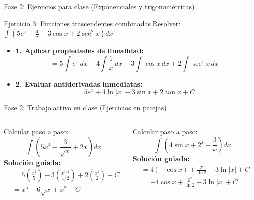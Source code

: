\documentclass[aspectratio=169,11pt]{beamer}
\begin{document}
\begin{frame}{Fase 2: Ejercicios para clase (Exponenciales y trigonométricas)}
\small
\begin{block}{Ejercicio 3: Funciones trascendentes combinadas}
Resolver: \quad $\displaystyle\int \left( 5e^x + \frac{4}{x} - 3\cos x + 2\sec^2 x \right) dx$
\end{block}
\vspace{0.06cm}
\begin{techbox}[title=Resolución paso a paso]
\footnotesize
\begin{itemize}[itemsep=2.5pt]
  \item \textbf{1. Aplicar propiedades de linealidad:}
  \[
  = 5\int e^x\,dx + 4\int \frac{1}{x}\,dx - 3\int \cos x\,dx + 2\int \sec^2 x\,dx
  \]
  \item \textbf{2. Evaluar antiderivadas inmediatas:}
  \[
  = 5e^x + 4\ln|x| - 3\sin x + 2\tan x + C
  \]
\end{itemize}
\end{techbox}
\end{frame}

\begin{frame}{Fase 2: Trabajo activo en clase (Ejercicios en parejas)}
\small
\begin{columns}[T,onlytextwidth]
\begin{checkbox}[title=Reto 1: Potencias y raíces]
\footnotesize
Calcular paso a paso:
\[
\int \left( 5x^4 - \frac{3}{\sqrt{x}} + 2x \right) dx
\]
\textbf{Solución guiada:}
\begin{align*}
  &= 5\left(\frac{x^5}{5}\right) - 3\left(\frac{x^{1/2}}{1/2}\right) + 2\left(\frac{x^2}{2}\right) + C \\
  &= x^5 - 6\sqrt{x} + x^2 + C
\end{align*}
\end{checkbox}

\begin{checkbox}[title=Reto 2: Trascendentes]
\footnotesize
Calcular paso a paso:
\[
\int \left( 4\sin x + 2^x - \frac{3}{x} \right) dx
\]
\textbf{Solución guiada:}
\begin{align*}
  &= 4(-\cos x) + \frac{2^x}{\ln 2} - 3\ln|x| + C \\
  &= -4\cos x + \frac{2^x}{\ln 2} - 3\ln|x| + C
\end{align*}
\end{checkbox}
\end{columns}
\end{frame}
\end{document}
